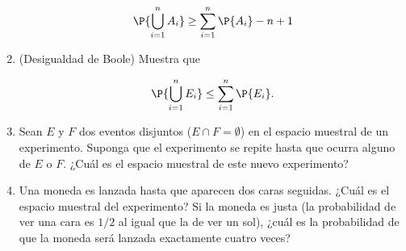 \documentclass{article}
\begin{document}
\begin{enumerate}
            \[ \P{\bigcup_{i=1}^n A_i} \ge \sum_{i=1}^n \P{A_i} - n + 1 \]

    
    \item (Desigualdad de Boole) Muestra que
    
            \[ \P{\bigcup_{i=1}^n E_i} \le \sum_{i=1}^n \P{E_i}. \]

    \item Sean $E$ y $F$ dos eventos disjuntos ($E\cap F = \emptyset$) en el espacio 
    muestral de un experimento. Suponga que el experimento se repite hasta que ocurra
    alguno de $E$ o $F$. ¿Cuál es el espacio muestral de este nuevo experimento?

    \item Una moneda es lanzada hasta que aparecen dos caras seguidas. ¿Cuál es el 
    espacio muestral del experimento? Si la moneda es justa (la probabilidad de 
    ver una cara es $1/2$ al igual que la de ver un sol), ¿cuál es la probabilidad de
    que la moneda será lanzada exactamente cuatro veces?

    
\end{enumerate}
\end{document}
